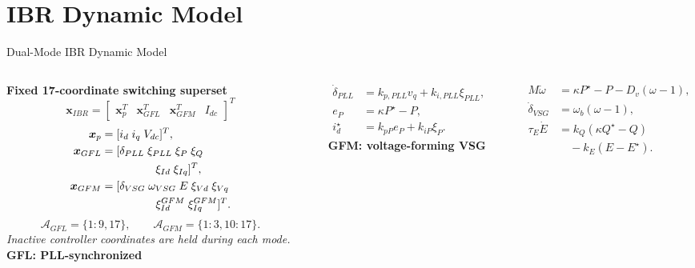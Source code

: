 ﻿\documentclass{beamer}
\begin{document}
\section{IBR Dynamic Model}
\begin{frame}{Dual-Mode IBR Dynamic Model}
\begin{columns}[t,onlytextwidth]
\scriptsize
\textbf{Fixed 17-coordinate switching superset}
\[
\bm{x}_{IBR}=\begin{bmatrix}
\bm{x}_{p}^{T}&\bm{x}_{GFL}^{T}&\bm{x}_{GFM}^{T}&I_{dc}
\end{bmatrix}^{T}
\]
\begin{align*}
\bm{x}_{p}&=[i_d\;i_q\;V_{dc}]^T,\\
\bm{x}_{GFL}&=[\delta_{PLL}\;\xi_{PLL}\;\xi_P\;\xi_Q\\
&\hspace{1.7cm}\xi_{Id}\;\xi_{Iq}]^T,\\
\bm{x}_{GFM}&=[\delta_{VSG}\;\omega_{VSG}\;E\;\xi_{Vd}\;\xi_{Vq}\\
&\hspace{1.7cm}\xi_{Id}^{GFM}\;\xi_{Iq}^{GFM}]^T.
\end{align*}
\[
\mathcal{A}_{GFL}=\{1{:}9,17\},\qquad
\mathcal{A}_{GFM}=\{1{:}3,10{:}17\}.
\]
\textit{Inactive controller coordinates are held during each mode.}
\scriptsize
{\color{myblue}\textbf{GFL: PLL-synchronized}}\\[-0.15em]
\rule{\linewidth}{0.35pt}
\begin{align*}
\dot\delta_{PLL}&=k_{p,PLL}v_q+k_{i,PLL}\xi_{PLL},\\
e_P&=\kappa P^\star-P,\\
i_d^\star&=k_{pP}e_P+k_{iP}\xi_P.
\end{align*}
\vspace{0.25cm}
{\color{myblue}\textbf{GFM: voltage-forming VSG}}\\[-0.15em]
\rule{\linewidth}{0.35pt}
\begin{align*}
M\dot\omega&=\kappa P^\star-P-D_v(\omega-1),\\
\dot\delta_{VSG}&=\omega_b(\omega-1),\\
\tau_E\dot E&=k_Q(\kappa Q^\star-Q)\\
&\quad-k_E(E-E^\star).
\end{align*}
\end{columns}
\end{frame}
\end{document}
